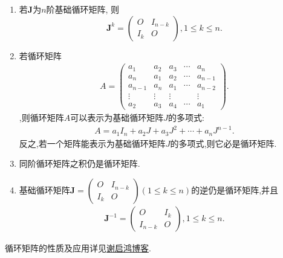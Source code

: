 \documentclass[lang=cn,newtx,10pt,scheme=chinese]{elegantbook}
\begin{document}
\begin{proposition}[循环矩阵的性质]\label{proposition:循环矩阵的性质}
\begin{enumerate}
    \item 若$\boldsymbol{J}$为$n$阶基础循环矩阵,
则
\[
    \boldsymbol{J}^{k} = 
\begin{pmatrix}
O & I_{n - k} \\
I_{k} & O
\end{pmatrix},  1 \leq k \leq n.
\]
\item 若循环矩阵\begin{align*}
    A=\begin{pmatrix}
        a_1 & a_2 & a_3 & \cdots & a_n \\
        a_n & a_1 & a_2 & \cdots & a_{n - 1} \\
        a_{n - 1} & a_n & a_1 & \cdots & a_{n - 2} \\
        \vdots & \vdots & \vdots & & \vdots \\
        a_2 & a_3 & a_4 & \cdots & a_1
        \end{pmatrix}.
\end{align*}
,则循环矩阵$A$可以表示为基础循环矩阵$J$的多项式:
\begin{align*}
    A=a_1I_n+a_2J+a_3J^2+\cdots+a_nJ^{n-1}.
\end{align*}
反之,若一个矩阵能表示为基础循环矩阵$J$的多项式,则它必是循环矩阵.
\item \label{example:iten546641856}同阶循环矩阵之积仍是循环矩阵.
\item 基础循环矩阵$\boldsymbol{J}=
\begin{pmatrix}
O & I_{n - k} \\
I_{k} & O
\end{pmatrix} (1 \leq k \leq n)$的逆仍是循环矩阵,并且
\begin{align*}
    \boldsymbol{J}^{-1} =\begin{pmatrix}
        O & I_{k} \\
        I_{n-k} & O
        \end{pmatrix},1 \leq k \leq n.
\end{align*}
\end{enumerate}
\end{proposition}
\begin{note}
    循环矩阵的性质及应用详见\href{https://www.cnblogs.com/torsor/p/8848641.html}{谢启鸿博客}.
\end{note}
\end{document}
